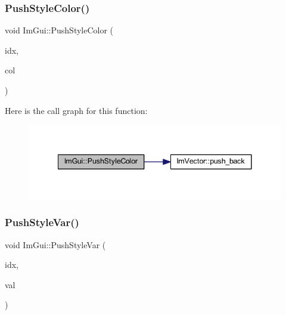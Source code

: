 \subsubsection{\texorpdfstring{Push\+Style\+Color()}{PushStyleColor()}\hspace{0.1cm}{\footnotesize\ttfamily [2/2]}}
{\footnotesize\ttfamily void Im\+Gui\+::\+Push\+Style\+Color (\begin{DoxyParamCaption}\item[{\mbox{\hyperlink{imgui_8h_a1b0467ec582e731ae6292fef726fb5fe}{Im\+Gui\+Col}}}]{idx,  }\item[{const \mbox{\hyperlink{struct_im_vec4}{Im\+Vec4}} \&}]{col }\end{DoxyParamCaption})}

Here is the call graph for this function\+:
\nopagebreak
\begin{figure}[H]
\begin{center}
\leavevmode
\includegraphics[width=341pt]{namespace_im_gui_a5bd052ebf55015312a53739974950e7b_cgraph}
\end{center}
\end{figure}
\mbox{\label{namespace_im_gui_aab3f43009094462cf2a5eb554785949b}} 
\subsubsection{\texorpdfstring{Push\+Style\+Var()}{PushStyleVar()}\hspace{0.1cm}{\footnotesize\ttfamily [1/2]}}
{\footnotesize\ttfamily void Im\+Gui\+::\+Push\+Style\+Var (\begin{DoxyParamCaption}\item[{\mbox{\hyperlink{imgui_8h_ac919acabce24faae590e295b424874ca}{Im\+Gui\+Style\+Var}}}]{idx,  }\item[{float}]{val }\end{DoxyParamCaption})}

